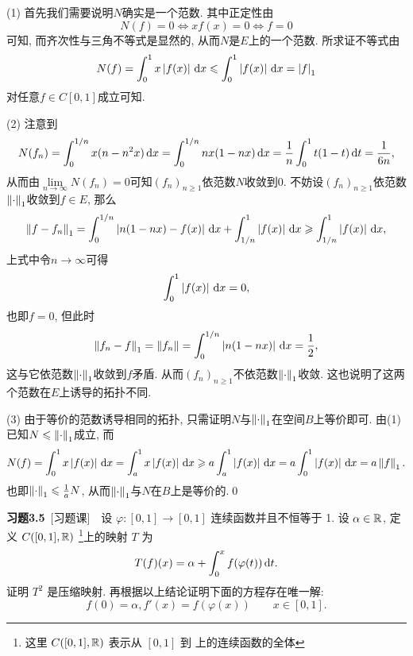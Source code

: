 	\begin{Proof}
	(1) 首先我们需要说明$ N $确实是一个范数. 其中正定性由
	\[
	N(f)=0\Longleftrightarrow xf(x)=0\Longleftrightarrow f=0
	\]
	可知, 而齐次性与三角不等式是显然的, 从而$ N $是$ E $上的一个范数. 所求证不等式由
	\[
	N(f)=\int_0^1x\left| f(x) \right| \,\mathrm{d} x\leqslant\int_0^1\left| f(x) \right| \,\mathrm{d} x=\left| f \right| _1
	\]
	对任意$ f\in C[0,1] $成立可知.
	
	(2) 注意到
	\[
	N(f_n)=\int_0^{1/n}x(n-n^2x)\,\mathrm{d} x=\int_0^{1/n}nx(1-nx)\,\mathrm{d} x=\frac{1}{n}\int_0^1t(1-t)\,\mathrm{d} t=\frac{1}{6n},
	\]
	从而由$ \lim\limits_{n\to\infty}N(f_n)=0 $可知$ (f_n)_{n\geqslant 1} $依范数$ N $收敛到0. 不妨设$ (f_n)_{n\geqslant 1} $依范数$ \left\| \cdot \right\|_1 $收敛到$ f\in E $, 那么
	\[
	\left\| f-f_n \right\|_1=\int_0^{1/n}\left| n(1-nx)-f(x) \right| \,\mathrm{d} x+\int_{1/n}^1\left| f(x) \right| \,\mathrm{d} x\geqslant\int_{1/n}^1\left| f(x) \right| \,\mathrm{d} x,
	\]
	上式中令$ n\to\infty $可得
	\[
	\int_0^1\left| f(x) \right| \,\mathrm{d} x=0,
	\]
	也即$ f=0 $, 但此时
	\[
	\left\| f_n-f \right\|_1=\left\| f_n \right\|=\int_0^{1/n}\left| n(1-nx) \right| \,\mathrm{d} x=\frac{1}{2},
	\]
	这与它依范数$ \left\| \cdot \right\|_1 $收敛到$ f $矛盾. 从而$ (f_n)_{n\geqslant 1} $不依范数$ \left\| \cdot \right\|_1 $收敛. 这也说明了这两个范数在$ E $上诱导的拓扑不同.
	
	(3) 由于等价的范数诱导相同的拓扑, 只需证明$ N $与$ \left\| \cdot \right\|_1 $在空间$ B $上等价即可. 由(1)已知$ N\leqslant\left\| \cdot \right\|_1 $成立, 而
	\[
	N(f)=\int_0^1x\left| f(x) \right| \,\mathrm{d} x=\int_a^1x\left| f(x) \right| \,\mathrm{d} x\geqslant a\int_a^1\left| f(x) \right| \,\mathrm{d} x=a\int_0^1\left| f(x) \right| \,\mathrm{d} x=a\left\| f \right\|_1.
	\]
	也即$ \left\| \cdot \right\|_1\leqslant\frac{1}{a}N $, 从而$ \left\| \cdot \right\|_1 $与$ N $在$ B $上是等价的.\qed
	\end{Proof}

	\textbf{习题3.5}\ [习题课]\ \ 设 $ \varphi:[0, 1]\to [0, 1] $ 连续函数并且不恒等于 1. 设 $ \alpha\in\mathbb{R} $, 定义 $ C([0, 1],\mathbb{R}) $ \footnote{这里 $ C([0, 1],\mathbb{R}) $ 表示从 $ [0, 1] $ 到 \R 上的连续函数的全体 }上的映射 $ T $ 为
	\[
		T(f)(x)=\alpha+\int_{0}^{x}f(\varphi(t))\,\mathrm{d} t.
	\]
	证明 $ T^2 $ 是压缩映射. 再根据以上结论证明下面的方程存在唯一解:
	\begin{equation}\label{eq:3.5题公式}
		f(0)=\alpha, f'(x)=f(\varphi(x))\qquad x\in[0, 1].
	\end{equation}

